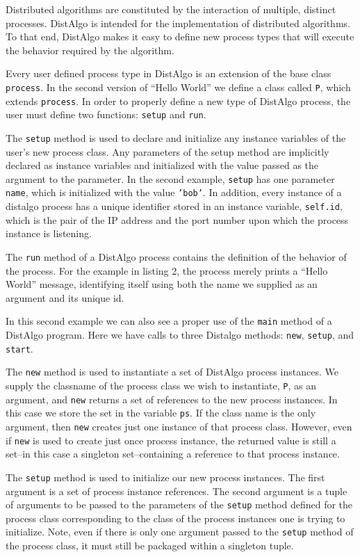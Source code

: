 \documentclass[11pt]{article}
\begin{document}
\noindent Distributed algorithms are constituted by the interaction of multiple, distinct
processes. DistAlgo is intended for the implementation of distributed
algorithms. To that end, DistAlgo makes it easy to define new process types
that will execute the behavior required by the algorithm.

Every user defined process type in DistAlgo is an extension of the base class
\texttt{process}. In the second version of ``Hello World'' we define a class
called \texttt{P}, which extends \texttt{process}. In order to properly define
a new type of DistAlgo process, the user must define two functions:
\texttt{setup} and \texttt{run}.

The \texttt{setup} method is used to declare and initialize any instance
variables of the user's new process class. Any parameters of the setup method
are implicitly declared as instance variables and initialized with the value
passed as the argument to the parameter. In the second example, \texttt{setup}
has one parameter \texttt{name}, which is initialized with the value
\texttt{'bob'}. In addition, every instance of a distalgo process has a unique
identifier stored in an instance variable, \texttt{self.id}, which is the pair
of the IP address and the port number upon which the process instance is
listening.

The \texttt{run} method of a DistAlgo process contains the definition of the
behavior of the process. For the example in listing 2, the process merely
prints a ``Hello World'' message, identifying itself using both the name we
supplied as an argument and its unique id.

In this second example we can also see a proper use of the \texttt{main} method
of a DistAlgo program. Here we have calls to three Distalgo methods:
\texttt{new}, \texttt{setup}, and \texttt{start}.

The \texttt{new} method is used to instantiate a set of DistAlgo process
instances. We supply the classname of the process class we wish to instantiate,
\texttt{P}, as an argument, and \texttt{new} returns a set of references to the
new process instances. In this case we store the set in the variable
\texttt{ps}.  If the class name is the only argument, then \texttt{new} creates
just one instance of that process class. However, even if \texttt{new} is used
to create just once process instance, the returned value is still a set--in
this case a singleton set--containing a reference to that process instance.

The \texttt{setup} method is used to initialize our new process instances. The
first argument is a set of process instance references. The second argument is
a tuple of arguments to be passed to the parameters of the \texttt{setup}
method defined for the process class corresponding to the class of the process
instances one is trying to initialize. Note, even if there is only one argument
passed to the \texttt{setup} method of the process class, it must still be
packaged within a singleton tuple.
\end{document}
